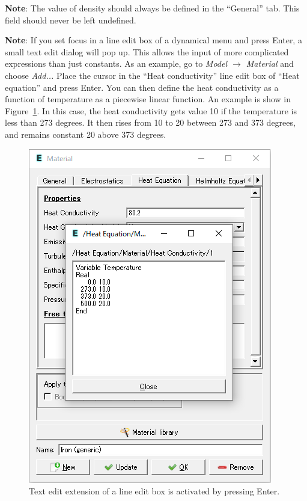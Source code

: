 \vskip2mm

{\bf Note}: The value of density should always be defined in the ``General'' tab. This
field should never be left undefined.

\vskip2mm

{\bf Note}: If you set focus in a line edit box of a dynamical menu and press Enter, a small
text edit dialog will pop up. This allows the input of more complicated expressions
than just constants. As an example, go to {\it Model $\rightarrow$ Material} and choose
{\it Add...} Place the cursor in the ``Heat conductivity'' line edit box of ``Heat
equation'' and press Enter. You can then define the heat conductivity
as a function of temperature as a piecewise linear function. An example is show in
Figure~\ref{fig_editbox}. In this case, the heat conductivity gets value 10 if the temperature is less
than 273 degrees. It then rises from 10 to 20 between 273 and 373 degrees, and
remains constant 20 above 373 degrees.

\begin{figure}[htb]
	\begin{center}
		\includegraphics[scale=0.5]{images/textedit.png}
		\caption{Text edit extension of a line edit box is activated by pressing Enter.}
		\label{fig_editbox}
	\end{center}
\end{figure}

